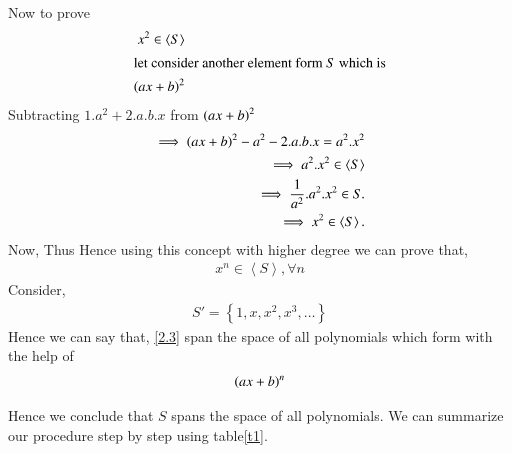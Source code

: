 \documentclass[journal,12pt,twocolumn]{IEEEtran}
\begin{document}
 Now to prove
 \begin{align}
  x^2 \in \left \langle S \right \rangle \\
 \intertext{let consider another element form $S$ which is}
    \left(ax+b\right)^2
\end{align}
Subtracting $1.a^2 +2.a.b.x$ from $\left(ax+b\right)^2$
 \begin{align}
 \implies \left(ax+b\right)^2 - a^2 - 2.a.b.x = a^2.x^2 \label{2.2}\\
 \implies a^2.x^2 \in \left \langle S \right \rangle\\
 \implies   \frac{1}{a^2} . a^2. x^2 \in S.\\
 \implies x^2 \in  \left \langle S \right \rangle .
 \end{align}
 Now, Thus  Hence using this concept with higher degree we can prove that,
 \begin{align}
   x^n \in  \left \langle S \right \rangle, \forall  n
  \end{align}
Consider,
 \begin{align}
 S' =   \left \{    1, x, x^2, x^3,  \dots  \right \} \label{2.3}
   \end{align}
 Hence we can say that, \eqref{2.3} span the space of all polynomials which form with the help of
 \begin{align} 
  \left(ax + b\right)^n
  \end{align}
   
Hence we conclude   that $S$ spans the space of all polynomials.
We can summarize our procedure step by step using table\ref{t1}.

\renewcommand{\thetable}{1}
%
\end{document}

